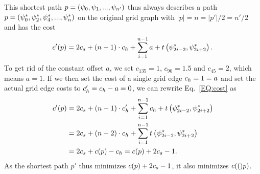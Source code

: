 \documentclass{sig-alternate-sigmod09}
\begin{document}
This shortest path $p = (\psi_0, \psi_1, ..., \psi_{n'})$ thus always describes a path $p = (\psi^*_0, \psi^*_2, \psi^*_4, ..., \psi^*_{n})$ on the original grid graph with $|p| = n = |p'| / 2 = n' / 2$ and has the cost
%
\begin{align}
	c'(p) = 2 c_s + \left(n - 1\right) \cdot c_h + \sum_{i=1}^{n - 1} a + t\left(\psi^*_{2i - 2}, \psi^*_{2i+2}\right)\label{EQ:cost}.
\end{align}
%
To get rid of the constant offset $a$, we set $c_{135} = 1$, $c_{90} = 1.5$ and $c_{45} = 2$, which means $a = 1$.
If we then set the cost of a single grid edge $c_h = 1 = a$ and set the actual grid edge costs to $c'_h = c_h - a = 0$, we can rewrite Eq.~\ref{EQ:cost} as  
%
\begin{align}
	c'(p) &= 2 c_s +  \left(n - 1\right) \cdot c'_h + \sum_{i=1}^{n - 1} c_h + t\left(\psi^*_{2i - 2}, \psi^*_{2i+2}\right) \\
	     &= 2 c_s + \left(n - 2\right) \cdot c_h + \sum_{i=1}^{n - 1} t \left(\psi^*_{2i - 2}, \psi^*_{2i+2}\right) \\
	     &= 2 c_s + c(p) - c_h = c(p) + 2 c_s - 1.
\end{align}
%
As the shortest path $p'$ thus minimizes $c(p) + 2 c_s - 1$, it also minimizes $c(()p)$.
\end{document}
